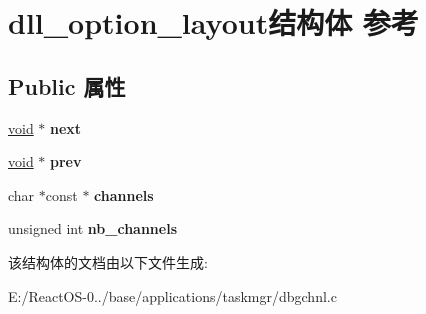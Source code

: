 \hypertarget{structdll__option__layout}{}\section{dll\+\_\+option\+\_\+layout结构体 参考}
\label{structdll__option__layout}
\subsection*{Public 属性}
\begin{DoxyCompactItemize}
\item 
\mbox{\label{structdll__option__layout_a92b9b7921c6843ed3abf9e0316060185}} 
\hyperlink{interfacevoid}{void} $\ast$ {\bfseries next}
\item 
\mbox{\label{structdll__option__layout_a1fa38f20c035c645e5320bb65c5cca76}} 
\hyperlink{interfacevoid}{void} $\ast$ {\bfseries prev}
\item 
\mbox{\label{structdll__option__layout_a704ce037a0463169b4f1f1277f379246}} 
char $\ast$const  $\ast$ {\bfseries channels}
\item 
\mbox{\label{structdll__option__layout_a8b22b0be56a60796789322ae8ff8c452}} 
unsigned int {\bfseries nb\+\_\+channels}
\end{DoxyCompactItemize}


该结构体的文档由以下文件生成\+:\begin{DoxyCompactItemize}
\item 
E\+:/\+React\+O\+S-\/0../base/applications/taskmgr/dbgchnl.\+c\end{DoxyCompactItemize}
